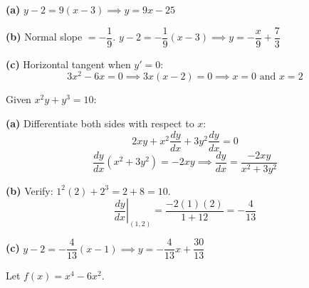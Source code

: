 \documentclass[addpoints]{exam}
\begin{document}
\begin{questions}
\begin{solution}[8cm]
\textbf{(a)} $y - 2 = 9(x - 3) \implies \boxed{y = 9x - 25}$

\textbf{(b)} Normal slope $= -\dfrac{1}{9}$.\quad
$y - 2 = -\dfrac{1}{9}(x - 3) \implies \boxed{y = -\dfrac{x}{9} + \dfrac{7}{3}}$

\textbf{(c)} Horizontal tangent when $y' = 0$:
\[
3x^2 - 6x = 0 \implies 3x(x - 2) = 0 \implies \boxed{x = 0 \text{ and } x = 2}
\]
\end{solution}

\question Given $x^2 y + y^3 = 10$:
\begin{solution}[8cm]
\textbf{(a)} Differentiate both sides with respect to $x$:
\[
2xy + x^2\frac{dy}{dx} + 3y^2\frac{dy}{dx} = 0
\]
\[
\frac{dy}{dx}(x^2 + 3y^2) = -2xy \implies \boxed{\frac{dy}{dx} = \frac{-2xy}{x^2 + 3y^2}}
\]

\textbf{(b)} Verify: $1^2(2) + 2^3 = 2 + 8 = 10$. \checkmark
\[
\left.\frac{dy}{dx}\right|_{(1,2)} = \frac{-2(1)(2)}{1 + 12} = \boxed{-\frac{4}{13}}
\]

\textbf{(c)}
$y - 2 = -\dfrac{4}{13}(x-1) \implies \boxed{y = -\dfrac{4}{13}x + \dfrac{30}{13}}$
\end{solution}

\question Let $f(x) = x^4 - 6x^2$.
\end{questions}
\end{document}

